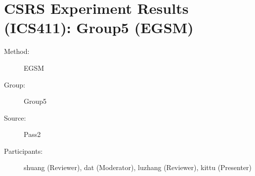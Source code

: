 \chapter {CSRS Experiment Results (ICS411): Group5 (EGSM)}
\small
	  

\begin{description}
\item [Method:] EGSM
\item [Group:] Group5
\item [Source:] Pass2
\item [Participants:] shuang (Reviewer), dat (Moderator), luzhang (Reviewer), kittu (Presenter)
\end{description}
